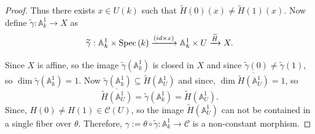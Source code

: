 \documentclass[11pt, reqno]{amsart}
\theoremstyle{plain}
\theoremstyle{definition}
\newcommand{\Spec}{{\rm Spec \,}}
\newcommand{\sC}{{\mathcal C}}
\newcommand{\A}{{\mathbb A}}
\begin{document}
\begin{proof}
Thus there exists $x \in U(k)$ such that $\widetilde{H}(0)(x)\neq \widetilde{H}(1)(x)$. Now define $\widetilde{\gamma}: \A^1_k \to X$ as
$$\widetilde{\gamma}: \A^1_k \times \Spec(k) \xrightarrow{(id\times x)} \A^1_k \times U \xrightarrow{\widetilde{H}} X.$$


 Since $X$ is affine, so the image $\widetilde{\gamma}(\A^1_k)$ is closed in $X$ and since $\widetilde{\gamma}(0) \neq \widetilde{\gamma}(1)$, so $\dim \widetilde{\gamma}(\A^1_k) = 1$. Now $\widetilde{\gamma}(\mathbb{A}^1_k) \subseteq \widetilde{H}(\mathbb{A}^1_U)$ and since, $\dim\overline{\widetilde{H}(\A^1_U)}= 1$, so
 $$\overline{\widetilde{H}(\A^1_U)} =   \widetilde{\gamma}(\mathbb{A}^1_k) = \widetilde{H}(\mathbb{A}^1_U).$$
 Since, $H(0) \neq H(1) \in \sC(U)$, so the image $\widetilde{H}(\mathbb{A}^1_U)$ 
 can not be contained in a single fiber over $\theta$.
Therefore, $\gamma:=\theta \circ \widetilde{\gamma}:\A^1_k \to \sC$ is a non-constant morphism.
 
\end{proof}
\end{document}
